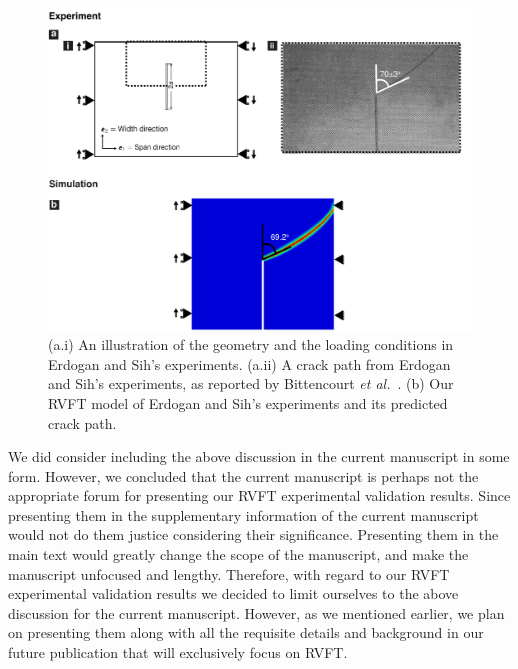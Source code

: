 \documentclass[11pt,letterpaper]{report}
\begin{document}
\begin{enumerate}[label=\textit{2.\arabic*},wide, labelwidth=!, labelindent=0pt]
\begin{figure}[hb!]
	\centering
	\includegraphics[width=\textwidth]{./Figures/Fig3_ver7.pdf}
	\caption{(a.i) An illustration of the geometry and the loading conditions in  Erdogan and Sih's experiments\cite{erdogan1963crack}. %
	(a.ii) A crack path from  Erdogan and Sih's experiments, as reported by Bittencourt \textit{et al.}~\cite{bittencourt1996quasi}. %
 (b) Our RVFT model of Erdogan and Sih's experiments and its predicted crack path. %
	\label{fig:ErgodanSih}
	}
\end{figure}

We did consider including  the above discussion in the current manuscript in some form. However, we concluded that the current manuscript is perhaps not the appropriate forum for presenting our RVFT experimental validation results. Since presenting them in the supplementary information of the current manuscript would not do them justice considering their  significance. Presenting them in the main text would greatly change the scope of the manuscript, and make the manuscript  unfocused and lengthy. Therefore, with regard to our RVFT experimental validation results we decided to limit ourselves to the above discussion for the current manuscript. However, as we mentioned earlier, we plan on presenting them along with all the requisite details and background in our future publication that will exclusively focus on RVFT.





\end{enumerate}
\end{document}
